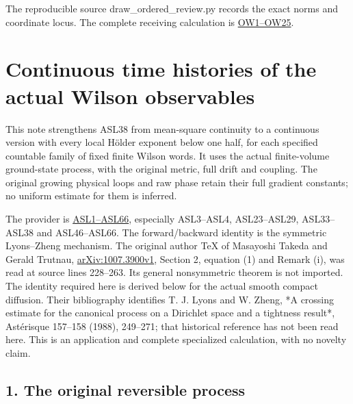 \documentclass[11pt]{article}
\begin{document}
The reproducible source draw\_ordered\_review.py records the exact norms and coordinate locus. The complete receiving calculation is \href{https://github.com/KokunoYumeto/yang-mills-interacting-workbench/blob/main/yang-mills/continuations/20261011-central-signs-shrinking-window/ORDERED_WILSON_ACTION.md}{OW1–OW25}.
\clearpage
\section*{Continuous time histories of the actual Wilson observables}

This note strengthens ASL38 from mean-square continuity to a continuous version with every local Hölder exponent below one half, for each specified countable family of fixed finite Wilson words. It uses the actual finite-volume ground-state process, with the original metric, full drift and coupling. The original growing physical loops and raw phase retain their full gradient constants; no uniform estimate for them is inferred.

The provider is \href{https://github.com/KokunoYumeto/yang-mills-interacting-workbench/blob/main/yang-mills/continuations/20261011-central-signs-shrinking-window/ACTUAL_SEMIGROUP_LIMIT.md}{ASL1–ASL66}, especially ASL3–ASL4, ASL23–ASL29, ASL33–ASL38 and ASL46–ASL66. The forward/backward identity is the symmetric Lyons–Zheng mechanism. The original author TeX of Masayoshi Takeda and Gerald Trutnau, \href{https://arxiv.org/abs/1007.3900v1}{arXiv:1007.3900v1}, Section 2, equation (1) and Remark (i), was read at source lines 228–263. Its general nonsymmetric theorem is not imported. The identity required here is derived below for the actual smooth compact diffusion. Their bibliography identifies T. J. Lyons and W. Zheng, *A crossing estimate for the canonical process on a Dirichlet space and a tightness result*, Astérisque 157–158 (1988), 249–271; that historical reference has not been read here. This is an application and complete specialized calculation, with no novelty claim.

\subsection*{1. The original reversible process}
\end{document}
